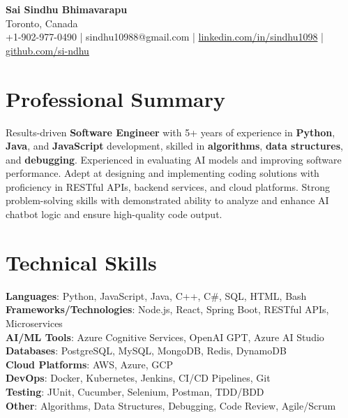 \documentclass[letterpaper,11pt]{article}
\begin{document}
\begin{center}
  {\Large \textbf{Sai Sindhu Bhimavarapu}} \\
  Toronto, Canada \\
  +1-902-977-0490 \enspace | \enspace sindhu10988@gmail.com \enspace | \enspace \href{https://www.linkedin.com/in/sindhu1098/}{linkedin.com/in/sindhu1098} \enspace | \enspace \href{https://github.com/si-ndhu}{github.com/si-ndhu}
\end{center}

\section{Professional Summary}
  \begin{itemize}[leftmargin=0.15in, label={}]
    \small{\item{
     Results-driven \textbf{Software Engineer} with 5+ years of experience in \textbf{Python}, \textbf{Java}, and \textbf{JavaScript} development, skilled in \textbf{algorithms}, \textbf{data structures}, and \textbf{debugging}. Experienced in evaluating AI models and improving software performance. Adept at designing and implementing coding solutions with proficiency in RESTful APIs, backend services, and cloud platforms. Strong problem-solving skills with demonstrated ability to analyze and enhance AI chatbot logic and ensure high-quality code output.
    }}
  \end{itemize}
\vspace{-16pt}

\section{Technical Skills}
 \begin{itemize}[leftmargin=0.15in, label={}]
    \small{\item{
     \textbf{Languages}: Python, JavaScript, Java, C++, C\#, SQL, HTML, Bash \\
     \textbf{Frameworks/Technologies}: Node.js, React, Spring Boot, RESTful APIs, Microservices \\
     \textbf{AI/ML Tools}: Azure Cognitive Services, OpenAI GPT, Azure AI Studio \\
     \textbf{Databases}: PostgreSQL, MySQL, MongoDB, Redis, DynamoDB \\
     \textbf{Cloud Platforms}: AWS, Azure, GCP \\
     \textbf{DevOps}: Docker, Kubernetes, Jenkins, CI/CD Pipelines, Git \\
     \textbf{Testing}: JUnit, Cucumber, Selenium, Postman, TDD/BDD \\
     \textbf{Other}: Algorithms, Data Structures, Debugging, Code Review, Agile/Scrum
    }}
 \end{itemize}
\vspace{-16pt}
\end{document}
